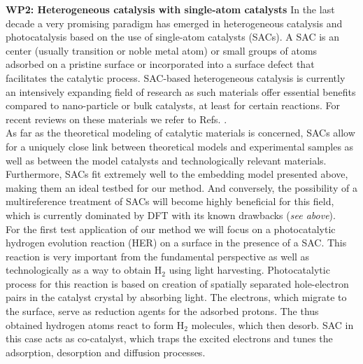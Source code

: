 \documentclass[a4paper,11pt,headings=normal]{scrartcl}
\begin{document}
\begin{itemize}
\noindent
\textbf{WP2: Heterogeneous catalysis with single-atom catalysts}
In the last decade a very promising paradigm has emerged in heterogeneous 
catalysis and photocatalysis based on the use of single-atom catalysts (SACs). A 
SAC is an center (usually transition or noble metal atom) or small groups of atoms 
adsorbed on a pristine surface or incorporated into a surface defect that 
facilitates the catalytic process. SAC-based heterogeneous catalysis is currently 
an intensively expanding field of research as such materials offer essential 
benefits compared to nano-particle or bulk catalysts, at least for certain 
reactions. For recent reviews on these materials we refer to Refs. 
\cite{Wu_2025,Kment_2024,Li_2024}.\\
As far as the theoretical 
modeling of catalytic materials is concerned, SACs allow for a uniquely close link 
between theoretical models and experimental samples as well as between the model 
catalysts and technologically relevant materials. Furthermore, SACs fit extremely 
well to the embedding model presented above, making them an ideal testbed for our 
method. And conversely, the possibility of a multireference treatment of SACs will 
become highly beneficial for this field, which is currently dominated by DFT with 
its known drawbacks (\textit{see above}).\\
For the first test application of our method we will focus on a photocatalytic hydrogen evolution reaction (HER) on a surface in the presence of a SAC. This reaction is very important from the fundamental perspective as well as technologically as a way to obtain H$_2$ using light harvesting. Photocatalytic process for this reaction\autocite{Ferriday_2021,Wu_2025} is based on creation of spatially separated hole-electron pairs in the catalyst crystal by absorbing light. The electrons, which migrate to the surface, serve as reduction agents for the adsorbed protons. The thus obtained hydrogen atoms react to form H$_2$ molecules, which then desorb. SAC in this case acts as co-catalyst, which traps the excited electrons and tunes the adsorption, desorption and diffusion processes.\\

\end{itemize}
\end{document}
